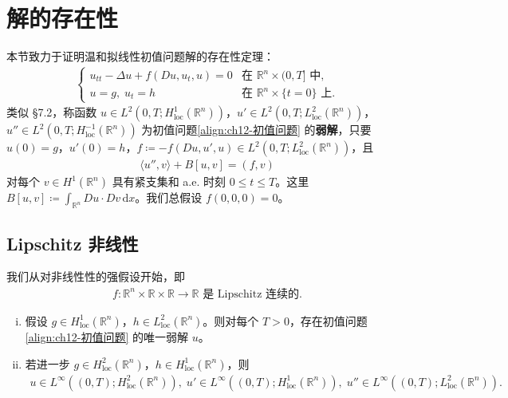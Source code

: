 \documentclass[../../main.tex]{subfiles}
\begin{document}
\section{解的存在性}\label{section:ch12-解的存在性}

本节致力于证明温和拟线性初值问题解的存在性定理：
\begin{align}
\begin{cases}
u_{tt}-\Delta u+f(Du,u_t,u)=0 & \text{在 } \mathbb{R}^n\times(0,T] \text{ 中},\\
u=g,\;u_t=h & \text{在 } \mathbb{R}^n\times\{t=0\} \text{ 上}.
\end{cases}
\label{align:ch12-初值问题}
\end{align}
类似 \S7.2，称函数 $u\in L^2(0,T;H^1_{\mathrm{loc}}(\mathbb{R}^n))$，$u'\in L^2(0,T;L^2_{\mathrm{loc}}(\mathbb{R}^n))$，$u''\in L^2(0,T;H^{-1}_{\mathrm{loc}}(\mathbb{R}^n))$ 为初值问题\eqref{align:ch12-初值问题} 的\textbf{弱解}，只要 $u(0)=g$，$u'(0)=h$，$f\coloneqq-f(Du,u',u)\in L^2(0,T;L^2_{\mathrm{loc}}(\mathbb{R}^n))$，且
\begin{align*}
\langle u'',v\rangle+B[u,v]=(f,v)
\end{align*}
对每个 $v\in H^1(\mathbb{R}^n)$ 具有紧支集和 a.e. 时刻 $0\leqslant t\leqslant T$。这里 $B[u,v]\coloneqq\int_{\mathbb{R}^n}Du\cdot Dv\,\mathrm{d}x$。我们总假设 $f(0,0,0)=0$。

\subsection{Lipschitz 非线性}\label{subsection:ch12-Lipschitz非线性}

我们从对非线性性的强假设开始，即
\begin{align}
f:\mathbb{R}^n\times\mathbb{R}\times\mathbb{R}\to\mathbb{R} \text{ 是 Lipschitz 连续的}.
\label{align:ch12-Lipschitz条件}
\end{align}

\begin{theorem}[存在性与唯一性。]\label{theorem:ch12-Lipschitz存在唯一性}
\begin{enumerate}[(i)]
\item 假设 $g\in H^1_{\mathrm{loc}}(\mathbb{R}^n)$，$h\in L^2_{\mathrm{loc}}(\mathbb{R}^n)$。则对每个 $T>0$，存在初值问题\eqref{align:ch12-初值问题} 的唯一弱解 $u$。
\item 若进一步 $g\in H^2_{\mathrm{loc}}(\mathbb{R}^n)$，$h\in H^1_{\mathrm{loc}}(\mathbb{R}^n)$，则
\begin{align*}
u\in L^\infty((0,T);H^2_{\mathrm{loc}}(\mathbb{R}^n)),\;u'\in L^\infty((0,T);H^1_{\mathrm{loc}}(\mathbb{R}^n)),\;u''\in L^\infty((0,T);L^2_{\mathrm{loc}}(\mathbb{R}^n)).
\end{align*}
\end{enumerate}
\end{theorem}
\end{document}
